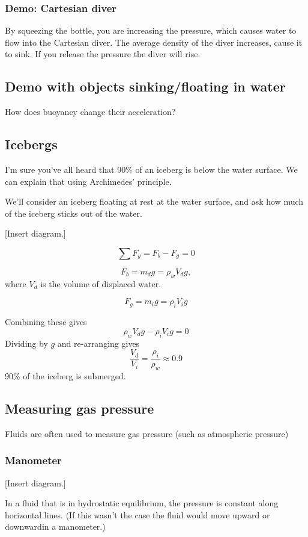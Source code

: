 \subsubsection{Demo: Cartesian diver}
By squeezing the bottle, you are increasing the pressure, which causes water to flow into the Cartesian diver. The average density of the diver increases, cause it to sink. If you release the pressure the diver will rise.

\subsection{Demo with objects sinking/floating in water}
How does buoyancy change their acceleration?

\subsection{Icebergs}
I'm sure you've all heard that 90\% of an iceberg is below the water surface. We can explain that using Archimedes' principle.

We'll consider an iceberg floating at rest at the water surface, and ask how much of the iceberg sticks out of the water.

[Insert diagram.]
\vspace{5cm}

$$\sum F_y=F_b-F_g=0$$

$$F_b=m_dg=\rho_wV_dg,$$
where $V_d$ is the volume of displaced water.

$$F_g=m_ig=\rho_iV_ig$$

Combining these gives
$$\rho_wV_dg-\rho_iV_ig=0$$
Dividing by $g$ and re-arranging gives
$$\frac{V_d}{V_i}=\frac{\rho_i}{\rho_w}\approx 0.9$$
90\% of the iceberg is submerged.

\subsection{Measuring gas pressure}
Fluids are often used to measure gas pressure (such as atmospheric pressure)

\subsubsection{Manometer}
[Insert diagram.]\nopagebreak
\vspace{5cm}

In a fluid that is in hydrostatic equilibrium, the pressure is constant along horizontal lines. (If this wasn't the case the fluid would move upward or downwardin a manometer.)


